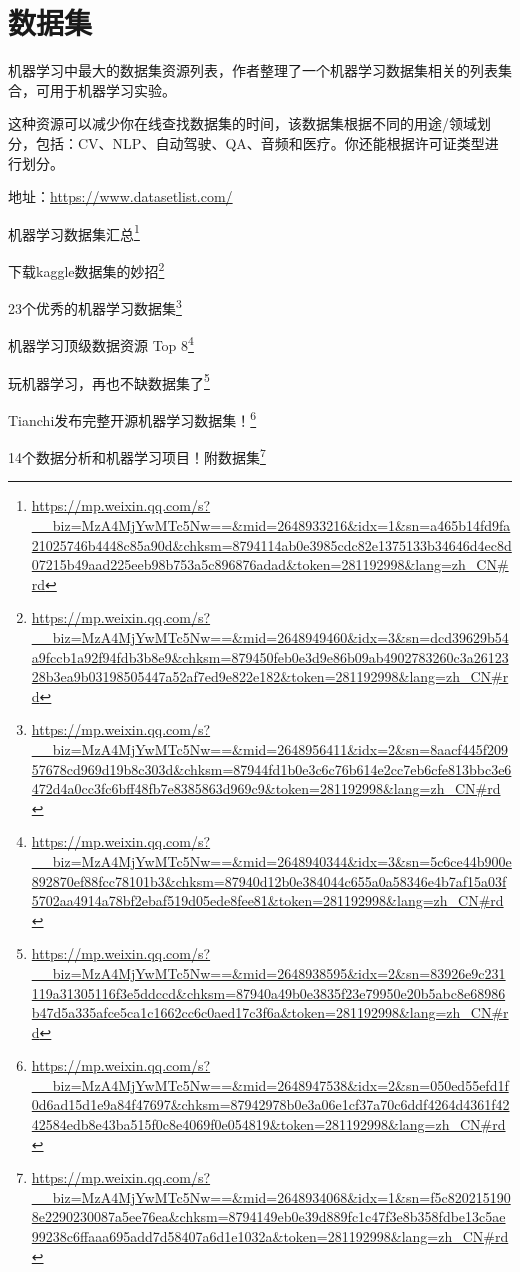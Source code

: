\documentclass[]{ctexbook}
\renewcommand{\href}[2]{#2\footnote{\url{#1}}}
\begin{document}
\hypertarget{ux6570ux636eux96c6}{%
\section{数据集}\label{ux6570ux636eux96c6}}

机器学习中最大的数据集资源列表，作者整理了一个机器学习数据集相关的列表集合，可用于机器学习实验。

这种资源可以减少你在线查找数据集的时间，该数据集根据不同的用途/领域划分，包括：CV、NLP、自动驾驶、QA、音频和医疗。你还能根据许可证类型进行划分。

地址：\url{https://www.datasetlist.com/}

\href{https://mp.weixin.qq.com/s?__biz=MzA4MjYwMTc5Nw==\&mid=2648933216\&idx=1\&sn=a465b14fd9fa21025746b4448c85a90d\&chksm=8794114ab0e3985cdc82e1375133b34646d4ec8d07215b49aad225eeb98b753a5c896876adad\&token=281192998\&lang=zh_CN\#rd}{机器学习数据集汇总}

\href{https://mp.weixin.qq.com/s?__biz=MzA4MjYwMTc5Nw==\&mid=2648949460\&idx=3\&sn=dcd39629b54a9fccb1a92f94fdb3b8e9\&chksm=879450feb0e3d9e86b09ab4902783260c3a2612328b3ea9b03198505447a52af7ed9e822e182\&token=281192998\&lang=zh_CN\#rd}{下载kaggle数据集的妙招}

\href{https://mp.weixin.qq.com/s?__biz=MzA4MjYwMTc5Nw==\&mid=2648956411\&idx=2\&sn=8aacf445f20957678cd969d19b8c303d\&chksm=87944fd1b0e3c6c76b614e2cc7eb6cfe813bbc3e6472d4a0cc3fc6bff48fb7e8385863d969c9\&token=281192998\&lang=zh_CN\#rd}{23个优秀的机器学习数据集}

\href{https://mp.weixin.qq.com/s?__biz=MzA4MjYwMTc5Nw==\&mid=2648940344\&idx=3\&sn=5c6ce44b900e892870ef88fcc78101b3\&chksm=87940d12b0e384044c655a0a58346e4b7af15a03f5702aa4914a78bf2ebaf519d05ede8fee81\&token=281192998\&lang=zh_CN\#rd}{机器学习顶级数据资源 Top 8}

\href{https://mp.weixin.qq.com/s?__biz=MzA4MjYwMTc5Nw==\&mid=2648938595\&idx=2\&sn=83926e9c231119a31305116f3e5ddccd\&chksm=87940a49b0e3835f23e79950e20b5abc8e68986b47d5a335afce5ca1c1662cc6c0aed17c3f6a\&token=281192998\&lang=zh_CN\#rd}{玩机器学习，再也不缺数据集了}

\href{https://mp.weixin.qq.com/s?__biz=MzA4MjYwMTc5Nw==\&mid=2648947538\&idx=2\&sn=050ed55efd1f0d6ad15d1e9a84f47697\&chksm=87942978b0e3a06e1cf37a70c6ddf4264d4361f4242584edb8e43ba515f0c8e4069f0e054819\&token=281192998\&lang=zh_CN\#rd}{Tianchi发布完整开源机器学习数据集！}

\href{https://mp.weixin.qq.com/s?__biz=MzA4MjYwMTc5Nw==\&mid=2648934068\&idx=1\&sn=f5c8202151908e2290230087a5ee76ea\&chksm=8794149eb0e39d889fc1c47f3e8b358fdbe13c5ae99238c6ffaaa695add7d58407a6d1e1032a\&token=281192998\&lang=zh_CN\#rd}{14个数据分析和机器学习项目！附数据集}
\end{document}
